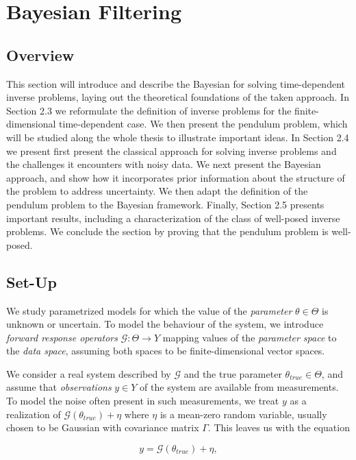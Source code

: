 \section{Bayesian Filtering}
\subsection{Overview}

This section will introduce and describe the Bayesian for solving time-dependent inverse problems, laying out the theoretical foundations of the taken approach. In Section 2.3 we reformulate the definition of inverse problems for the finite-dimensional time-dependent case. We then present the pendulum problem, which will be studied along the whole thesis to illustrate important ideas. In Section 2.4 we present first present the classical approach for solving inverse problems and the challenges it encounters with noisy data. We next present the Bayesian approach, and show how it incorporates prior information about the structure of the problem to address uncertainty. We then adapt the definition of the pendulum problem to the Bayesian framework. Finally, Section 2.5 presents important results, including a characterization of the class of well-posed inverse problems. We conclude the section by proving that the pendulum problem is well-posed.

\subsection{Set-Up}

We study parametrized models for which the value of the \textit{parameter} $\theta \in \Theta$ is unknown or uncertain. To model the behaviour of the system, we introduce \textit{forward response operators} $\mathcal{G} : \Theta \rightarrow Y$ mapping values of the \textit{parameter space} to the \textit{data space}, assuming both spaces to be finite-dimensional vector spaces.

We consider a real system described by $\mathcal{G}$ and the true parameter $\theta_{true} \in \Theta$, and assume that \textit{observations} $y \in Y$ of the system are available from measurements. To model the noise often present in such measurements, we treat $y$ as a realization of $\mathcal{G}(\theta_{true}) + \eta$ where $\eta$ is a mean-zero random variable, usually chosen to be Gaussian with covariance matrix $\Gamma$. This leaves us with the equation

\begin{equation}
  y = \mathcal{G}(\theta_{true}) + \eta,
\end{equation}


